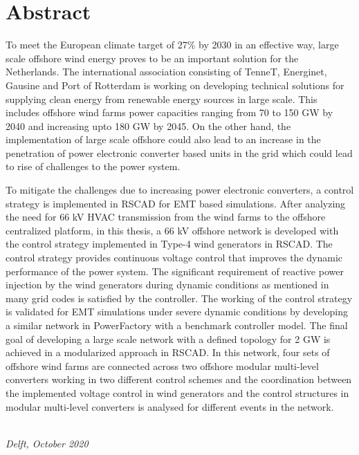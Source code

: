 \chapter*{Abstract}
To meet the European climate target of 27\% by 2030 in an effective way, large scale offshore wind energy proves to be an important solution for the Netherlands. The international association consisting of TenneT, Energinet, Gausine and Port of Rotterdam is working on developing technical solutions for supplying clean energy from renewable energy sources in large scale. This includes offshore wind farms power capacities ranging from 70 to 150 GW by 2040 and increasing upto 180 GW by 2045. On the other hand, the implementation of large scale offshore could also lead to an increase in the penetration of power electronic converter based units in the grid which could lead to rise of challenges to the power system.

To mitigate the challenges due to increasing power electronic converters, a control strategy is implemented in RSCAD for EMT based simulations. After analyzing the need for 66 kV \gls{HVAC} transmission from the wind farms to the offshore centralized platform, in this thesis, a 66 kV offshore network is developed with the control strategy implemented in Type-4 wind generators in RSCAD. The control strategy provides continuous voltage control that improves the dynamic performance of the power system. The significant requirement of reactive power injection by the wind generators during dynamic conditions as mentioned in many grid codes is satisfied by the controller. The working of the control strategy is validated for \gls{EMT} simulations under severe dynamic conditions by developing a similar network in PowerFactory with a benchmark controller model. The final goal of developing a large scale network with a defined topology for 2 GW is achieved in a modularized approach in RSCAD. In this network, four sets of offshore wind farms are connected across two offshore modular multi-level converters working in two different control schemes and the coordination between the implemented voltage control in wind generators and the control structures in modular multi-level converters is analysed for different events in the network.



\begin{flushright}
{\makeatletter\itshape
    \@author \\
    Delft, October 2020
\makeatother}
\end{flushright}



